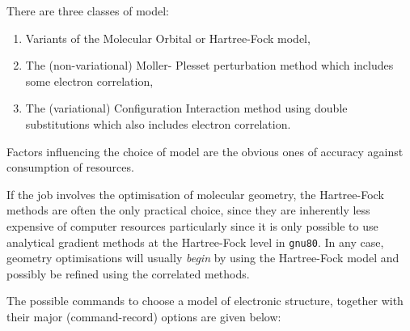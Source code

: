 There are three classes of model: 
\begin{enumerate}
\item Variants of the 
Molecular Orbital or Hartree-Fock model, 
\item The (non-variational) Moller-
Plesset perturbation method which includes some electron correlation,
\item The (variational) Configuration Interaction method using
double substitutions which also includes electron correlation.
\end{enumerate}
Factors influencing the choice of model are the obvious ones
of accuracy against consumption of resources. 

If the job involves the optimisation
of molecular geometry, the Hartree-Fock methods are often the only
practical choice, since they are inherently less expensive of
computer resources particularly since it is only possible to
use analytical gradient methods at the Hartree-Fock level in {\tt gnu80}.
In any case, geometry optimisations will usually {\em begin} by using the
Hartree-Fock model and  possibly be refined using the correlated
methods.

The possible commands to choose a model of electronic structure, together
with their major (command-record) options are given below: \\

